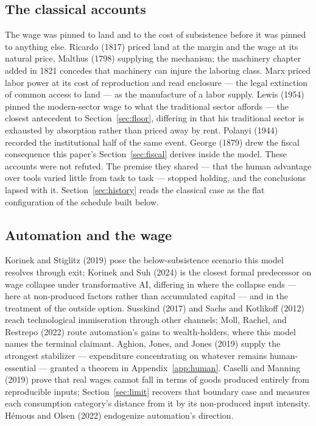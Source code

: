 \documentclass[12pt]{article}
\theoremstyle{plain}
\begin{document}
\subsection{The classical accounts}\label{sec:classical}

The wage was pinned to land and to the cost of subsistence before it was pinned to anything else. Ricardo (1817) priced land at the margin and the wage at its natural price, Malthus (1798) supplying the mechanism; the machinery chapter added in 1821 concedes that machinery can injure the laboring class. Marx priced labor power at its cost of reproduction and read enclosure --- the legal extinction of common access to land --- as the manufacture of a labor supply. Lewis (1954) pinned the modern-sector wage to what the traditional sector affords --- the closest antecedent to Section~\ref{sec:floor}, differing in that his traditional sector is exhausted by absorption rather than priced away by rent. Polanyi (1944) recorded the institutional half of the same event. George (1879) drew the fiscal consequence this paper's Section~\ref{sec:fiscal} derives inside the model. These accounts were not refuted. The premise they shared --- that the human advantage over tools varied little from task to task --- stopped holding, and the conclusions lapsed with it. Section~\ref{sec:history} reads the classical case as the flat configuration of the schedule built below.

\subsection{Automation and the wage}\label{sec:automation}

Korinek and Stiglitz (2019) pose the below-subsistence scenario this model resolves through exit; Korinek and Suh (2024) is the closest formal predecessor on wage collapse under transformative AI, differing in where the collapse ends --- here at non-produced factors rather than accumulated capital --- and in the treatment of the outside option. Susskind (2017) and Sachs and Kotlikoff (2012) reach technological immiseration through other channels; Moll, Rachel, and Restrepo (2022) route automation's gains to wealth-holders, where this model names the terminal claimant. Aghion, Jones, and Jones (2019) supply the strongest stabilizer --- expenditure concentrating on whatever remains human-essential --- granted a theorem in Appendix~\ref{app:human}. Caselli and Manning (2019) prove that real wages cannot fall in terms of goods produced entirely from reproducible inputs; Section~\ref{sec:limit} recovers that boundary case and measures each consumption category's distance from it by its non-produced input intensity. Hémous and Olsen (2022) endogenize automation's direction.
\end{document}
